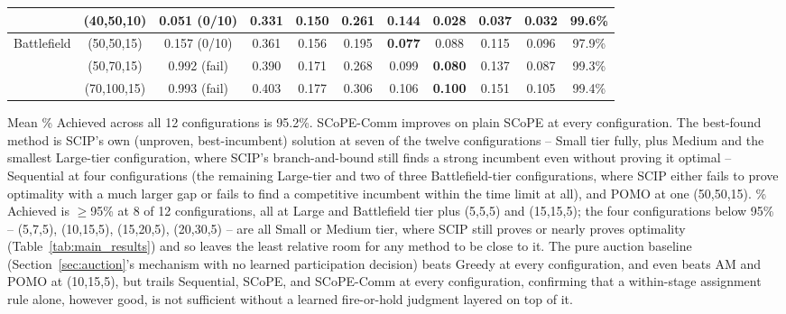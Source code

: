 \begin{table}[htbp]
\begin{adjustbox}{max width=\textwidth}
\begin{tabular}{c|c|c|ccccccc|c}
                              & (40,50,10)  & 0.051 (0/10)  & 0.331 & 0.150 & 0.261 & 0.144 & \textbf{0.028} & 0.037 & 0.032 & 99.6\% \\ \hline
\multirow{3}{*}{Battlefield} & (50,50,15)  & 0.157 (0/10)  & 0.361 & 0.156 & 0.195 & \textbf{0.077} & 0.088 & 0.115 & 0.096 & 97.9\% \\
                              & (50,70,15)  & 0.992 (fail)  & 0.390 & 0.171 & 0.268 & 0.099 & \textbf{0.080} & 0.137 & 0.087 & 99.3\% \\
                              & (70,100,15) & 0.993 (fail)  & 0.403 & 0.177 & 0.306 & 0.106 & \textbf{0.100} & 0.151 & 0.105 & 99.4\% \\ \hline
\end{tabular}
\end{adjustbox}
\end{table}
Mean \% Achieved across all 12 configurations is 95.2\%. SCoPE-Comm improves on plain SCoPE at every configuration. The best-found method is SCIP's own (unproven, best-incumbent) solution at seven of the twelve configurations -- Small tier fully, plus Medium and the smallest Large-tier configuration, where SCIP's branch-and-bound still finds a strong incumbent even without proving it optimal -- Sequential at four configurations (the remaining Large-tier and two of three Battlefield-tier configurations, where SCIP either fails to prove optimality with a much larger gap or fails to find a competitive incumbent within the time limit at all), and POMO at one (50,50,15). \% Achieved is $\geq$95\% at 8 of 12 configurations, all at Large and Battlefield tier plus (5,5,5) and (15,15,5); the four configurations below 95\% -- (5,7,5), (10,15,5), (15,20,5), (20,30,5) -- are all Small or Medium tier, where SCIP still proves or nearly proves optimality (Table~\ref{tab:main_results}) and so leaves the least relative room for any method to be close to it. The pure auction baseline (Section~\ref{sec:auction}'s mechanism with no learned participation decision) beats Greedy at every configuration, and even beats AM and POMO at (10,15,5), but trails Sequential, SCoPE, and SCoPE-Comm at every configuration, confirming that a within-stage assignment rule alone, however good, is not sufficient without a learned fire-or-hold judgment layered on top of it.

